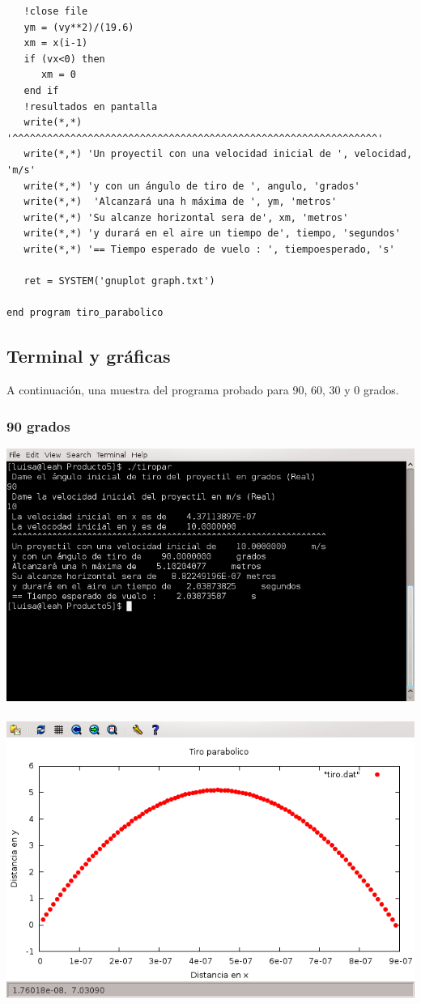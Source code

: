 \documentclass[10pt]{article}
\begin{document}
\begin{verbatim}
   !close file
   ym = (vy**2)/(19.6)
   xm = x(i-1)
   if (vx<0) then
      xm = 0
   end if
   !resultados en pantalla
   write(*,*) '^^^^^^^^^^^^^^^^^^^^^^^^^^^^^^^^^^^^^^^^^^^^^^^^^^^^^^^^^^^^^^^'
   write(*,*) 'Un proyectil con una velocidad inicial de ', velocidad, 'm/s'
   write(*,*) 'y con un ángulo de tiro de ', angulo, 'grados'
   write(*,*)  'Alcanzará una h máxima de ', ym, 'metros'
   write(*,*) 'Su alcanze horizontal sera de', xm, 'metros'
   write(*,*) 'y durará en el aire un tiempo de', tiempo, 'segundos'
   write(*,*) '== Tiempo esperado de vuelo : ', tiempoesperado, 's'

   ret = SYSTEM('gnuplot graph.txt')

end program tiro_parabolico
\end{verbatim}
\newpage

\subsection{Terminal y gráficas}
A continuación, una muestra del programa probado para 90, 60, 30 y 0 grados.
\subsubsection{90 grados}
\includegraphics[scale=0.6]{screen90.png} \\
\\
\includegraphics[scale=0.6]{grafica90.png}
\end{document}
